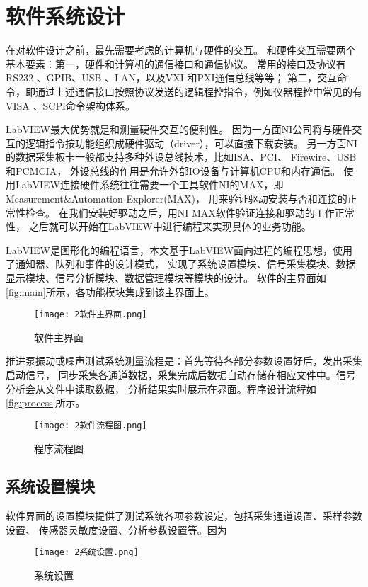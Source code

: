 \section{软件系统设计}
在对软件设计之前，最先需要考虑的计算机与硬件的交互。
和硬件交互需要两个基本要素：第一，硬件和计算机的通信接口和通信协议。
常用的接口及协议有RS232 、GPIB、USB 、LAN，以及VXI 和PXI通信总线等等；
第二，交互命令，即通过上述通信接口按照协议发送的逻辑程控指令，例如仪器程控中常见的有VISA 、SCPI命令架构体系。

LabVIEW最大优势就是和测量硬件交互的便利性。
因为一方面NI公司将与硬件交互的逻辑指令按功能组织成硬件驱动（driver），可以直接下载安装。
另一方面NI的数据采集板卡一般都支持多种外设总线技术，比如ISA、PCI、 Firewire、USB 和PCMCIA，
外设总线的作用是允许外部IO设备与计算机CPU和内存通信。
使用LabVIEW连接硬件系统往往需要一个工具软件NI的MAX，即Measurement\&Automation Explorer(MAX)，
用来验证驱动安装与否和连接的正常性检查。
在我们安装好驱动之后，用NI MAX软件验证连接和驱动的工作正常性，
之后就可以开始在LabVIEW中进行编程来实现具体的业务功能。

LabVIEW是图形化的编程语言，本文基于LabVIEW面向过程的编程思想，使用了通知器、队列和事件的设计模式，
实现了系统设置模块、信号采集模块、数据显示模块、信号分析模块、数据管理模块等模块的设计。
软件的主界面如\autoref{fig:main}所示，各功能模块集成到该主界面上。
\begin{figure}[htbp]
    \centering
    \texttt{[image: 2软件主界面.png]}
    \caption{\label{fig:main}软件主界面}
\end{figure}

推进泵振动或噪声测试系统测量流程是：首先等待各部分参数设置好后，发出采集启动信号，
同步采集各通道数据，采集完成后数据自动存储在相应文件中。信号分析会从文件中读取数据，
分析结果实时展示在界面。程序设计流程如\autoref{fig:process}所示。
\begin{figure}[htbp]
    \centering
    \texttt{[image: 2软件流程图.png]}
    \caption{\label{fig:process}程序流程图}
\end{figure}

\subsection{系统设置模块}
软件界面的设置模块提供了测试系统各项参数设定，包括采集通道设置、采样参数设置、
传感器灵敏度设置、分析参数设置等。因为
\begin{figure}[htbp]
    \centering
    \texttt{[image: 2系统设置.png]}
    \caption{\label{fig:setting}系统设置}
\end{figure}

